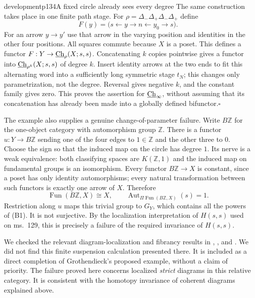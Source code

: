 \begin{dcomment}{development}{p134}{A fixed circle already sees every degree}
The same construction takes place in one finite path stage. For
$\rho=\Delta_-\Delta_+\Delta_-\Delta_+$ define
\[
 F(y)=\bigl(s\longleftarrow y\longrightarrow n
                    \longleftarrow y_0\longrightarrow s\bigr).
\]
For an arrow $y\to y'$ use that arrow in the varying position and identities in the other four positions. All squares commute because $X$ is a poset. This defines a functor $F:Y\to\underline{\mathrm{Ch}}_\rho(X;s,s)$. Concatenating $k$ copies pointwise gives a functor into $\underline{\mathrm{Ch}}_{\rho^k}(X;s,s)$ of degree $k$. Insert identity arrows at the two ends to fit this alternating word into a sufficiently long symmetric stage $t_N$; this changes only parametrization, not the degree. Reversal gives negative $k$, and the constant family gives zero. This proves the assertion for $\underline{\mathrm{Ch}}_\infty$, without assuming that its concatenation has already been made into a globally defined bifunctor.\hfill$\square$

The example also supplies a genuine change-of-parameter failure. Write $B\mathbb Z$ for the one-object category with automorphism group $\mathbb Z$. There is a functor $u:Y\to B\mathbb Z$ sending one of the four edges to $1\in\mathbb Z$ and the other three to $0$. Choose the sign so that the induced map on the circle has degree $1$. Its nerve is a weak equivalence: both classifying spaces are $K(\mathbb Z,1)$ and the induced map on fundamental groups is an isomorphism. Every functor $B\mathbb Z\to X$ is constant, since a poset has only identity automorphisms; every natural transformation between such functors is exactly one arrow of $X$. Therefore
\[
 \operatorname{Fun}(B\mathbb Z,X)\cong X,
 \qquad
 \operatorname{Aut}_{\Pi\operatorname{Fun}(B\mathbb Z,X)}(s)=1.
\]
Restriction along $u$ maps this trivial group to $G_Y$, which contains all the powers of (B1). It is not surjective. By the localization interpretation of $H(s,s)$ used on ms.~129, this is precisely a failure of the required invariance of $H(s,s)$.

We checked the relevant diagram-localization and fibrancy results in \citet{Cisinski2009LocallyConstant}, \citet{Thomason1980}, and \citet{Raptis2010}. We did not find this finite suspension calculation presented there. It is included as a direct completion of Grothendieck's proposed example, without a claim of priority. The failure proved here concerns localized \emph{strict} diagrams in this relative category. It is consistent with the homotopy invariance of coherent diagrams explained above.
\end{dcomment}



